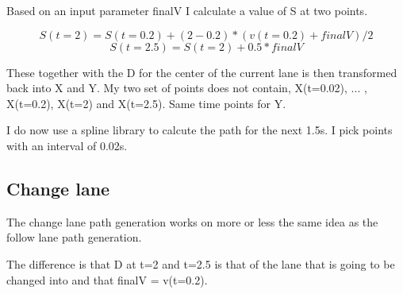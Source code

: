 \documentclass[12pt,a4paper]{article}
\begin{document}
Based on an input parameter finalV I calculate a value of S at two points.

$$S(t=2) = S(t=0.2) + (2-0.2) * (v(t=0.2) + finalV)/2$$
$$S(t=2.5) = S(t=2) + 0.5 * finalV$$

These together with the D for the center of the current lane is then transformed back into X and Y. My two set of points does not contain, X(t=0.02), ... , X(t=0.2), X(t=2) and X(t=2.5). Same time points for Y.

I do now use a spline library to calcute the path for the next 1.5s. I pick points with an interval of 0.02s.

\subsection{Change lane}
The change lane path generation works on more or less the same idea as the follow lane path generation.

The difference is that D at t=2 and t=2.5 is that of the lane that is going to be changed into and that finalV = v(t=0.2).

\newpage
\appendix
\end{document}
